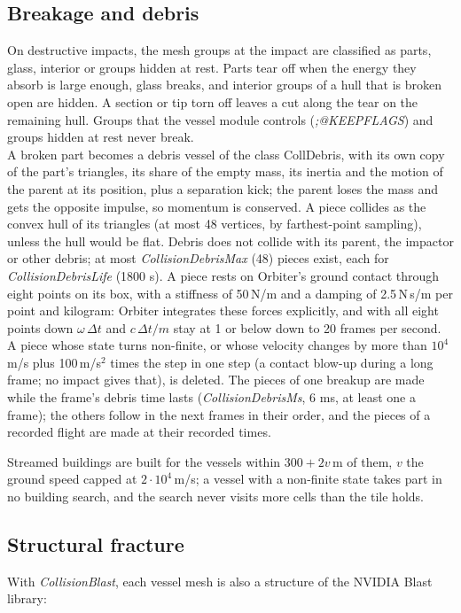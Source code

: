 \documentclass[Orbiter Technical Reference.tex]{subfiles}
\begin{document}
\subsection{Breakage and debris}
On destructive impacts, the mesh groups at the impact are classified as parts, glass, interior or groups hidden at rest. Parts tear off when the energy they absorb is large enough, glass breaks, and interior groups of a hull that is broken open are hidden. A section or tip torn off leaves a cut along the tear on the remaining hull. Groups that the vessel module controls (\textit{;@KEEPFLAGS}) and groups hidden at rest never break.\\
A broken part becomes a debris vessel of the class CollDebris, with its own copy of the part's triangles, its share of the empty mass, its inertia and the motion of the parent at its position, plus a separation kick; the parent loses the mass and gets the opposite impulse, so momentum is conserved. A piece collides as the convex hull of its triangles (at most 48 vertices, by farthest-point sampling), unless the hull would be flat. Debris does not collide with its parent, the impactor or other debris; at most \textit{CollisionDebrisMax} (48) pieces exist, each for \textit{CollisionDebrisLife} (1800 s). A piece rests on Orbiter's ground contact through eight points on its box, with a stiffness of 50\,N/m and a damping of 2.5\,N\,s/m per point and kilogram: Orbiter integrates these forces explicitly, and with all eight points down $\omega\,\Delta t$ and $c\,\Delta t/m$ stay at 1 or below down to 20 frames per second. A piece whose state turns non-finite, or whose velocity changes by more than $10^{4}$\,m/s plus 100\,m/s$^{2}$ times the step in one step (a contact blow-up during a long frame; no impact gives that), is deleted. The pieces of one breakup are made while the frame's debris time lasts (\textit{CollisionDebrisMs}, 6 ms, at least one a frame); the others follow in the next frames in their order, and the pieces of a recorded flight are made at their recorded times.

Streamed buildings are built for the vessels within $300 + 2v$\,m of them, $v$ the ground speed capped at $2\cdot10^{4}$\,m/s; a vessel with a non-finite state takes part in no building search, and the search never visits more cells than the tile holds.


\subsection{Structural fracture}
With \textit{CollisionBlast}, each vessel mesh is also a structure of the NVIDIA Blast library:
\end{document}
